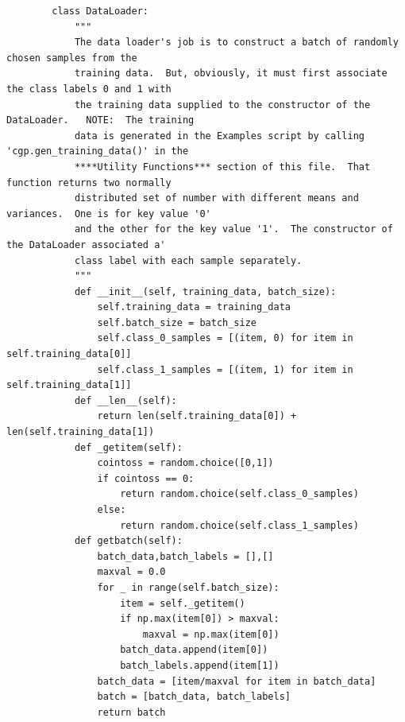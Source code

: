 \documentclass{article}
\begin{document}
\begin{verbatim}
        class DataLoader:
            """
            The data loader's job is to construct a batch of randomly chosen samples from the
            training data.  But, obviously, it must first associate the class labels 0 and 1 with
            the training data supplied to the constructor of the DataLoader.   NOTE:  The training
            data is generated in the Examples script by calling 'cgp.gen_training_data()' in the
            ****Utility Functions*** section of this file.  That function returns two normally
            distributed set of number with different means and variances.  One is for key value '0'
            and the other for the key value '1'.  The constructor of the DataLoader associated a'
            class label with each sample separately.
            """
            def __init__(self, training_data, batch_size):
                self.training_data = training_data
                self.batch_size = batch_size
                self.class_0_samples = [(item, 0) for item in self.training_data[0]]
                self.class_1_samples = [(item, 1) for item in self.training_data[1]]
            def __len__(self):
                return len(self.training_data[0]) + len(self.training_data[1])
            def _getitem(self):
                cointoss = random.choice([0,1])
                if cointoss == 0:
                    return random.choice(self.class_0_samples)
                else:
                    return random.choice(self.class_1_samples)
            def getbatch(self):
                batch_data,batch_labels = [],[]
                maxval = 0.0
                for _ in range(self.batch_size):
                    item = self._getitem()
                    if np.max(item[0]) > maxval:
                        maxval = np.max(item[0])
                    batch_data.append(item[0])
                    batch_labels.append(item[1])
                batch_data = [item/maxval for item in batch_data]
                batch = [batch_data, batch_labels]
                return batch


\end{verbatim}
\end{document}
